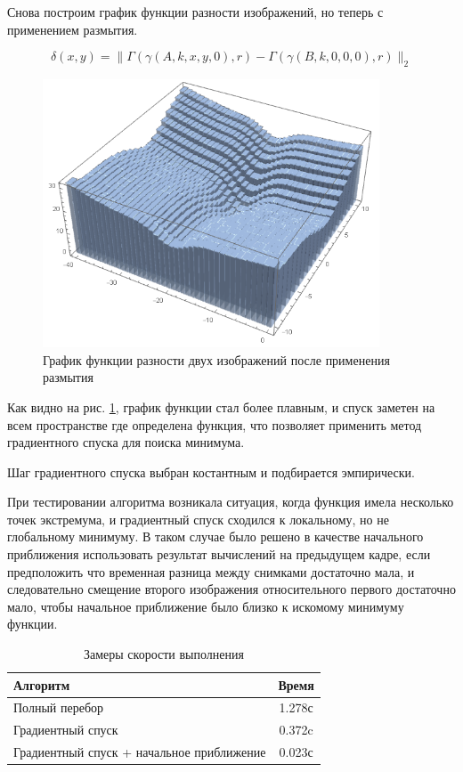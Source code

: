 \documentclass[a4paper,12pt]{article}
\begin{document}
Снова построим график функции разности изображений, но теперь с применением размытия.

\begin{equation}
    \delta(x,y)=\|\Gamma(\gamma(A,k,x,y,0),r)-\Gamma(\gamma(B,k,0,0,0),r)\|_2
\end{equation}

\begin{figure}[H]
    \centering
    \includegraphics[width=10cm]{pictures/Graphic2.png}
    \caption{График функции разности двух изображений после применения размытия}
    \label{fig:graphic_delta_blur} 
\end{figure}

Как видно на рис. \ref{fig:graphic_delta_blur}, график функции стал более плавным, и спуск заметен на всем пространстве где определена функция, что позволяет применить метод градиентного спуска для поиска минимума. 

Шаг градиентного спуска выбран костантным и подбирается эмпирически. 

При тестировании алгоритма возникала ситуация, когда функция имела несколько точек экстремума, и градиентный спуск сходился к локальному, но не глобальному минимуму. В таком случае было решено в качестве начального приближения использовать результат вычислений на предыдущем кадре, если предположить что временная разница между снимками достаточно мала, и следовательно смещение второго изображения относительного первого достаточно мало, чтобы начальное приближение было близко к искомому минимуму функции. 

\begin{table}[H]
    \centering
    \begin{tabular}{|l|c|}
        \hline
        Алгоритм & Время \\
        \hline
        Полный перебор & 1.278с \\
        \hline
        Градиентный спуск & 0.372c \\
        \hline
        Градиентный спуск + начальное приближение & 0.023с  \\
        \hline
    \end{tabular}
    \caption{Замеры скорости выполнения}
    \label{tab:gradient_time}
\end{table}
\end{document}
